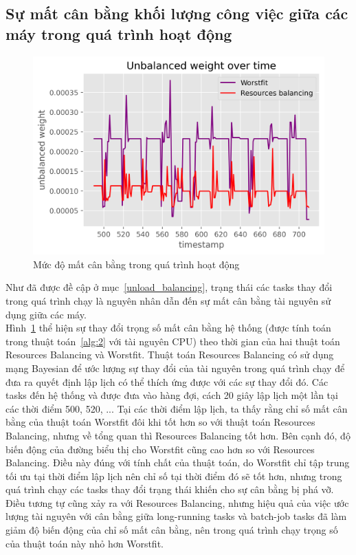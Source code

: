 \documentclass{my_style}
\begin{document}
\subsection{Sự mất cân bằng khối lượng công việc giữa các máy trong quá trình hoạt động}
\begin{figure}[h!]
	\centering
	\includegraphics[scale=0.75]{images/unbalanced_weights.png}
	\caption{Mức độ mất cân bằng trong quá trình hoạt động}
	\label{fig:realtime_weights}
\end{figure}

\noindent
Như đã được đề cập ở mục~\ref{unload_balancing}, trạng thái các tasks thay đổi trong quá trình chạy là nguyên nhân dẫn đến sự mất cân bằng tài nguyên sử dụng giữa các máy.\\
Hình~\ref{fig:realtime_weights} thể hiện sự thay đổi trọng số mất cân bằng hệ thống (được tính toán trong thuật toán~\ref{alg:2} với tài nguyên CPU) theo thời gian của hai thuật toán Resources Balancing và Worstfit. Thuật toán Resources Balancing có sử dụng mạng Bayesian để ước lượng sự thay đổi của tài nguyên trong quá trình chạy để đưa ra quyết định lập lịch có thể thích ứng được với các sự thay đổi đó. Các tasks đến hệ thống và được đưa vào hàng đợi, cách 20 giây lập lịch một lần tại các thời điểm 500, 520, ... Tại các thời điểm lập lịch, ta thấy rằng chỉ số mất cân bằng của thuật toán Worstfit đôi khi tốt hơn so với thuật toán Resources Balancing, nhưng về tổng quan thì Resources Balancing tốt hơn. Bên cạnh đó, độ biến động của đường biểu thị cho Worstfit cũng cao hơn so với Resources Balancing. Điều này đúng với tính chất của thuật toán, do Worstfit chỉ tập trung tối ưu tại thời điểm lập lịch nên chỉ số tại thời điểm đó sẽ tốt hơn, nhưng trong quá trình chạy các tasks thay đổi trạng thái khiến cho sự cân bằng bị phá vỡ. Điều tương tự cũng xảy ra với Resources Balancing, nhưng hiệu quả của việc ước lượng tài nguyên với cân bằng giữa long-running tasks và batch-job tasks đã làm giảm độ biến động của chỉ số mất cân bằng, nên trong quá trình chạy trọng số của thuật toán này nhỏ hơn Worstfit. 
\end{document}
